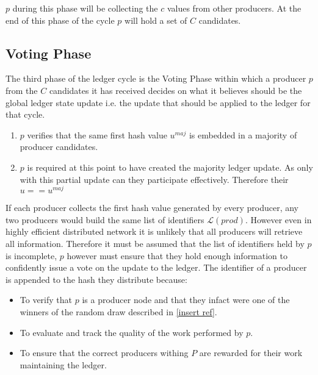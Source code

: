 \documentclass{article}
\begin{document}
$p$ during this phase will be collecting the $c$ values from other producers. At the end of this phase of the cycle $p$ will hold a set of $C$ candidates.



\subsection{Voting Phase}

The third phase of the ledger cycle is the Voting Phase within which a producer $p$ from the $C$ candidates it has received decides on what it believes should be the global ledger state update i.e. the update that should be applied to the ledger for that cycle. 



\begin{enumerate}
\item $p$ verifies that the same first hash value $u^{maj}$ is embedded in a majority of producer candidates. 
\item $p$ is required at this point to have created the majority ledger update. As only with this partial update can they participate effectively. Therefore their $u == u^{maj}$

\end{enumerate}
 
If each producer collects the first hash value generated by every producer, any two producers would build the same list of identifiers $\mathcal{L}(prod)$. However even in highly efficient distributed network it is unlikely that all producers will retrieve all information. Therefore it must be assumed that the list of identifiers held by $p$ is incomplete, $p$ however must ensure that they hold enough information to confidently issue a vote on the update to the ledger. The identifier of a producer is appended to the hash they distribute because: 

\begin{itemize}
\item To verify that $p$ is a producer node and that they infact were one of the winners of the random draw described in \ref{insert ref}. 
\item To evaluate and track the quality of the work performed by $p$.
\item To ensure that the correct producers withing $P$ are rewarded for their work maintaining the ledger. \\

\end{itemize} 
\end{document}
